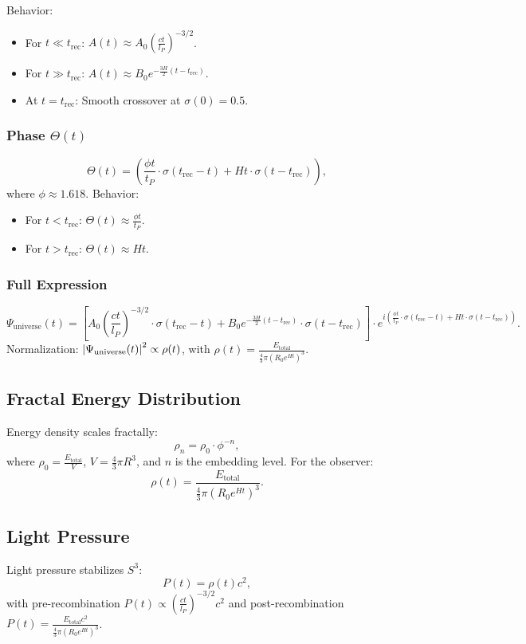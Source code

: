 \documentclass[11pt]{article}
\begin{document}
Behavior:
\begin{itemize}
    \item For $t \ll t_{\text{rec}}$: $A(t) \approx A_0 \left( \frac{c t}{l_P} \right)^{-3/2}$.
    \item For $t \gg t_{\text{rec}}$: $A(t) \approx B_0 e^{-\frac{3H}{2}(t - t_{\text{rec}})}$.
    \item At $t = t_{\text{rec}}$: Smooth crossover at $\sigma(0) = 0.5$.
\end{itemize}

\subsubsection{Phase $\Theta(t)$}
\[
\Theta(t) = \left( \frac{\phi t}{t_P} \cdot \sigma(t_{\text{rec}} - t) + H t \cdot \sigma(t - t_{\text{rec}}) \right),
\]
where $\phi \approx 1.618$. Behavior:
\begin{itemize}
    \item For $t < t_{\text{rec}}$: $\Theta(t) \approx \frac{\phi t}{t_P}$.
    \item For $t > t_{\text{rec}}$: $\Theta(t) \approx H t$.
\end{itemize}

\subsubsection{Full Expression}
\[
\Psi_{\text{universe}}(t) = \left[ A_0 \left( \frac{c t}{l_P} \right)^{-3/2} \cdot \sigma(t_{\text{rec}} - t) + B_0 e^{-\frac{3H}{2}(t - t_{\text{rec}})} \cdot \sigma(t - t_{\text{rec}}) \right] \cdot e^{i \left( \frac{\phi t}{t_P} \cdot \sigma(t_{\text{rec}} - t) + H t \cdot \sigma(t - t_{\text{rec}}) \right)}.
\]
Normalization: $\abs{\Psi_{\text{universe}}(t)}^2 \propto \rho(t)$, with $\rho(t) = \frac{E_{\text{total}}}{\frac{4}{3} \pi (R_0 e^{Ht})^3}$.

\subsection{Fractal Energy Distribution}
Energy density scales fractally:
\[
\rho_n = \rho_0 \cdot \phi^{-n},
\]
where $\rho_0 = \frac{E_{\text{total}}}{V}$, $V = \frac{4}{3} \pi R^3$, and $n$ is the embedding level. For the observer:
\[
\rho(t) = \frac{E_{\text{total}}}{\frac{4}{3} \pi (R_0 e^{Ht})^3}.
\]

\subsection{Light Pressure}
Light pressure stabilizes $S^3$:
\[
P(t) = \rho(t) c^2,
\]
with pre-recombination $P(t) \propto \left( \frac{c t}{l_P} \right)^{-3/2} c^2$ and post-recombination $P(t) = \frac{E_{\text{total}} c^2}{\frac{4}{3} \pi (R_0 e^{Ht})^3}$.
\end{document}
